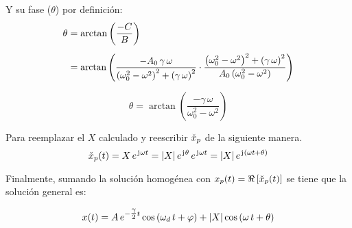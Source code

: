Y su fase ($\theta$) por definición:
\begin{align*}
    \theta &= \arctan \left( \frac{-C}{B} \right)
    \\[1ex]
    &=
    \scale{0.97}{
    \arctan \left( \frac{-A_0 \, \gamma \, \omega}{\left( \omega_0^2 - \omega^2 \right)^2 + \left( \gamma \, \omega \right)^2} \cdot \frac{\left( \omega_0^2 - \omega^2 \right)^2 + \left( \gamma \, \omega \right)^2}{A_0 \left( \omega_0^2 - \omega^2 \right)} \right)
    }
\end{align*}

\begin{mdframed}[style=DefinitionFrame]
    \begin{defn}
    \end{defn}
    \begin{equation*}
        \theta = \arctan \left( \frac{-\gamma \, \omega}{\omega_0^2 - \omega^2} \right)
    \end{equation*}
\end{mdframed}

Para reemplazar el $X$ calculado y reescribir $\check{x}_p$ de la siguiente manera.
\[
    \check{x}_p(t) = X \, e^{\mkern2mu\mathrm{j}\mkern1mu \omega t} = {\left| {X} \right|} \, e^{\mkern2mu\mathrm{j}\mkern1mu \theta} \, e^{\mkern2mu\mathrm{j}\mkern1mu \omega t} = {\left| {X} \right|} \, e^{\mkern2mu\mathrm{j}\mkern1mu \left(\omega t + \theta \right)}
\]

Finalmente, sumando la solución homogénea con $x_p(t) = \Re \left[ \check{x}_p(t) \right]$ se tiene que la solución general es:

\begin{mdframed}[style=DefinitionFrame]
    \begin{defn}
    \end{defn}
    \begin{equation*}
        x(t) = A \, e^{-\tfrac{\gamma}{2} t} \cos \left( \omega_d \, t + \varphi \right) + {\left| {X} \right|} \cos \left( \omega \, t + \theta \right)
    \end{equation*}
\end{mdframed}